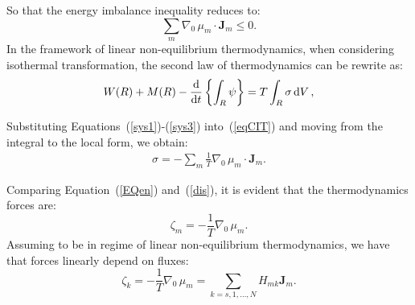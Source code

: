 So that the energy imbalance inequality reduces to:
\begin{equation}
\sum_m \nabla_0 \,\mu_m \cdot \mathbf{J}_m \leq 0.
\end{equation}
In the framework of linear non-equilibrium thermodynamics, when considering isothermal transformation, the second law of thermodynamics can be rewrite as:
\begin{equation}
W(R)+M(R)-\frac{\text{d}}{\text{d} t} \left\{\int_R \psi \right\} = T \int_R \sigma \,\text{d} V\, ,
\label{eqCIT}
\end{equation}

Substituting Equations~(\ref{sys1})-(\ref{sys3}) into~(\ref{eqCIT}) and moving from the integral to the local form, we obtain:
\begin{equation}
\begin{aligned}
\sigma = -  \sum_m \frac{1}{T}\nabla_0 \,\mu_m \cdot \mathbf{J}_m. \label{EQen}
\end{aligned} 
\end{equation}

Comparing Equation~(\ref{EQen}) and~(\ref{dis}), it is evident that the thermodynamics forces are:
\begin{equation}
\zeta_m = -\frac{1}{T} \nabla_0 \,\mu_m. \label{vflow1}
\end{equation}
Assuming to be in regime of linear non-equilibrium thermodynamics, we have that forces linearly depend on fluxes:
\begin{equation}
\zeta_k = -\frac{1}{T} \nabla_0 \,\mu_m =\sum_{k=s,1,\ldots,N} H_{mk} \mathbf{J}_m. \label{dif}
\end{equation}

